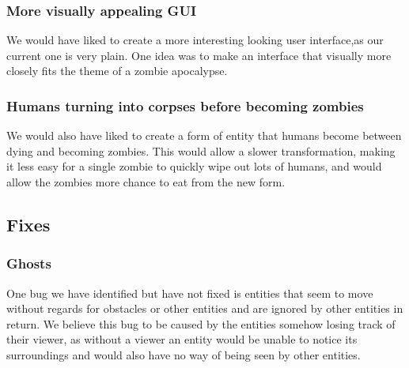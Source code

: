 \subsubsection{More visually appealing GUI}
We would have liked to create a more interesting looking user interface,as our current one is very plain.  One idea was to make an interface that visually more closely fits the theme of a zombie apocalypse. 

\subsubsection{Humans turning into corpses before becoming zombies}
We would also have liked to create a form of entity that humans become between dying and becoming zombies. This would allow a slower transformation, making it less easy for a single zombie to quickly wipe out lots of humans,  and would allow the zombies more chance to eat from the new form. 

\subsection{Fixes}

\subsubsection{Ghosts}
One bug we have identified but have not fixed is entities that seem to move without regards for obstacles or other entities and are ignored by other entities in return. We believe this bug to be caused by the entities somehow losing track of their viewer, as without a viewer an entity would be unable to notice its surroundings and would also have no way of being seen by other entities.

\clearpage
\endinput
